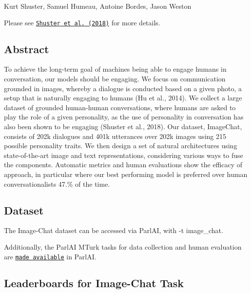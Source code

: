 Kurt Shuster, Samuel Humeau, Antoine Bordes, Jason Weston

Please see \href{https://arxiv.org/abs/1811.00945}{\tt Shuster et al. (2018)} for more details.

\subsection*{Abstract}

To achieve the long-\/term goal of machines being able to engage humans in conversation, our models should be engaging. We focus on communication grounded in images, whereby a dialogue is conducted based on a given photo, a setup that is naturally engaging to humans (Hu et al., 2014). We collect a large dataset of grounded human-\/human conversations, where humans are asked to play the role of a given personality, as the use of personality in conversation has also been shown to be engaging (Shuster et al., 2018). Our dataset, Image\+Chat, consists of 202k dialogues and 401k utterances over 202k images using 215 possible personality traits. We then design a set of natural architectures using state-\/of-\/the-\/art image and text representations, considering various ways to fuse the components. Automatic metrics and human evaluations show the efficacy of approach, in particular where our best performing model is preferred over human conversationalists 47.\% of the time.

\subsection*{Dataset}

The Image-\/\+Chat dataset can be accessed via Parl\+AI, with {\ttfamily -\/t image\+\_\+chat}.

Additionally, the Parl\+AI M\+Turk tasks for data collection and human evaluation are \href{https://github.com/facebookresearch/ParlAI/tree/master/parlai/mturk/tasks/image_chat}{\tt made available} in Parl\+AI.

\subsection*{Leaderboards for Image-\/\+Chat Task}


